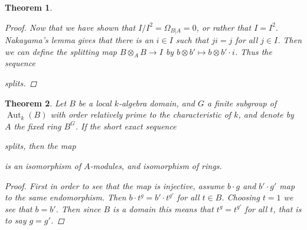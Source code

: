 \documentclass[11pt, a4paper, english]{article}
\numberwithin{prop}{section}
\numberwithin{lemma}{section}
\newtheorem{theorem}{Theorem}
\numberwithin{theorem}{section}
\numberwithin{defin}{section}
\numberwithin{example}{section}
\DeclareMathOperator{\End}{End}
\DeclareMathOperator{\Aut}{Aut}
\begin{document}
\begin{theorem}
\begin{proof}
Now that we have shown that $I/I^2 = \Omega_{B|A} = 0$, or rather that $I = I^2$. Nakayama's lemma gives that there is an $i \in I$ such that $ji = j$ for all $j \in I$. Then we can define the splitting map $B \otimes_A B \to I$ by $b \otimes b' \mapsto b \otimes b' \cdot i$. Thus the sequence 
\begin{center}
\end{center}
splits.
\end{proof}
\end{theorem}

\begin{theorem}
\label{thm:separable_implies_ringiso}
Let $B$ be a local $k$-algebra domain, and $G$ a finite subgroup of $\Aut_k(B)$ with order relatively prime to the characteristic of $k$, and denote by $A$ the fixed ring $B^G$. If the short exact sequence
\begin{center}
\end{center}
splits, then the map
\begin{center}
\end{center}
is an isomorphism of $A$-modules, and isomorphism of rings.

\begin{proof}
First in order to see that the map is injective, assume $b \cdot g$ and $b' \cdot g'$ map to the same endomorphism. Then $b \cdot t^g = b' \cdot t^{g'}$ for all $t \in B$. Choosing $t=1$ we see that $b = b'$. Then since $B$ is a domain this means that $t^g = t^{g'}$ for all $t$, that is to say $g = g'$.


\end{proof}
\end{theorem}
\end{document}
